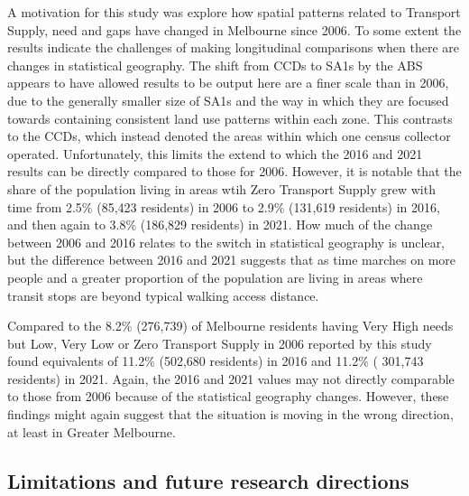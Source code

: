 \documentclass[preprint, 3p,
authoryear]{elsarticle} %
\begin{document}
A motivation for this study was explore how spatial patterns related to
Transport Supply, need and gaps have changed in Melbourne since 2006. To
some extent the results indicate the challenges of making longitudinal
comparisons when there are changes in statistical geography. The shift
from CCDs to SA1s by the ABS appears to have allowed results to be
output here are a finer scale than in 2006, due to the generally smaller
size of SA1s and the way in which they are focused towards containing
consistent land use patterns within each zone. This contrasts to the
CCDs, which instead denoted the areas within which one census collector
operated. Unfortunately, this limits the extend to which the 2016 and
2021 results can be directly compared to those for 2006. However, it is
notable that the share of the population living in areas wtih Zero
Transport Supply grew with time from 2.5\% (85,423 residents) in 2006 to
2.9\% (131,619 residents) in 2016, and then again to 3.8\% (186,829
residents) in 2021. How much of the change between 2006 and 2016 relates
to the switch in statistical geography is unclear, but the difference
between 2016 and 2021 suggests that as time marches on more people and a
greater proportion of the population are living in areas where transit
stops are beyond typical walking access distance.

Compared to the 8.2\% (276,739) of Melbourne residents having Very High
needs but Low, Very Low or Zero Transport Supply in 2006 reported by
\citet{currie2010identifying} this study found equivalents of 11.2\%
(502,680 residents) in 2016 and 11.2\% ( 301,743 residents) in 2021.
Again, the 2016 and 2021 values may not directly comparable to those
from 2006 because of the statistical geography changes. However, these
findings might again suggest that the situation is moving in the wrong
direction, at least in Greater Melbourne.

\subsection{Limitations and future research
directions}\label{limitations-and-future-research-directions}
\end{document}
